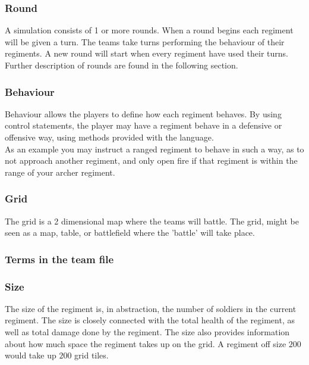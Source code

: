 		\subsubsection{Round}
		A simulation consists of 1 or more rounds. When a round begins each regiment will be given a turn.
		The teams take turns performing the behaviour of their regiments. 
		A new round will start when every regiment have used their turns.
		Further description of rounds are found in the following section.

		\subsubsection{Behaviour}
		Behaviour allows the players to define how each regiment behaves. 
		By using control statements, the player may have a regiment behave in a defensive or offensive way, 
		using methods provided with the language. \\
		As an example you may instruct a ranged regiment to behave in such a way, 
		as to not approach another regiment, and only open fire if that regiment is within the range of your archer regiment.
				
		\subsubsection{Grid}
		The grid is a 2 dimensional map where the teams will battle.
		The grid, might be seen as a map, table, or battlefield where the 'battle' will take place. 
																		
		\subsubsection{Terms in the team file }
	
		\subsubsection{Size}
		The size of the regiment is, in abstraction, the number of soldiers in the current regiment. 
		The size is closely connected with the total health of the regiment, as well as total damage done by the regiment.
		The size also provides information about how much space the regiment takes up on the grid. A regiment off size $200$ would take up $200$ grid tiles.

